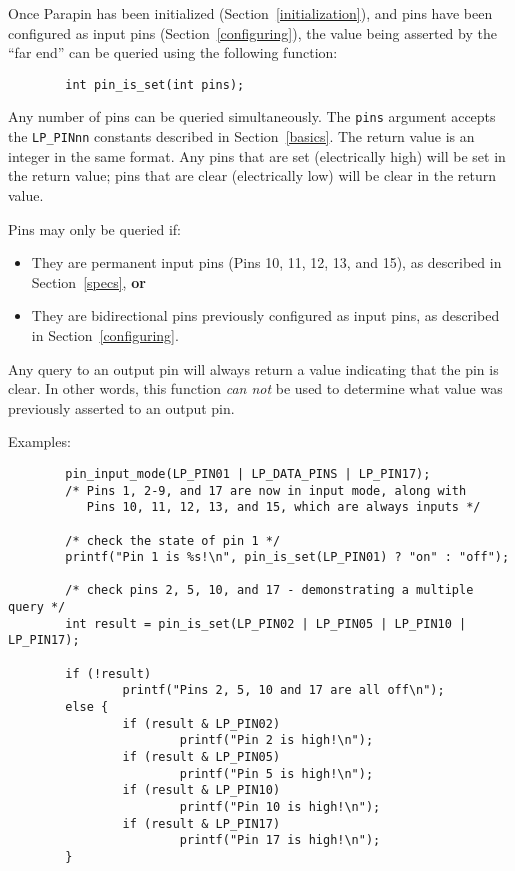 \documentclass{article}
\begin{document}
Once Parapin has been initialized (Section~\ref{initialization}), and
pins have been configured as input pins (Section~\ref{configuring}),
the value being asserted by the ``far end'' can be queried using the
following function:
\begin{verbatim}
        int pin_is_set(int pins);
\end{verbatim}

Any number of pins can be queried simultaneously.  The {\tt pins}
argument accepts the {\tt LP\_PINnn} constants described in
Section~\ref{basics}.  The return value is an integer in the same
format.  Any pins that are set (electrically high) will be set in the
return value; pins that are clear (electrically low) will be clear in
the return value.

Pins may only be queried if:
\begin{itemize}
\item They are permanent input pins (Pins 10, 11, 12, 13, and 15), as
described in Section~\ref{specs}, {\bf or}
\item They are bidirectional pins previously configured as input pins,
as described in Section~\ref{configuring}.
\end{itemize}

Any query to an output pin will always return a value indicating that
the pin is clear.  In other words, this function {\em can not} be used
to determine what value was previously asserted to an output pin.

Examples:
\begin{verbatim}
        pin_input_mode(LP_PIN01 | LP_DATA_PINS | LP_PIN17);
        /* Pins 1, 2-9, and 17 are now in input mode, along with
           Pins 10, 11, 12, 13, and 15, which are always inputs */

        /* check the state of pin 1 */
        printf("Pin 1 is %s!\n", pin_is_set(LP_PIN01) ? "on" : "off");

        /* check pins 2, 5, 10, and 17 - demonstrating a multiple query */
        int result = pin_is_set(LP_PIN02 | LP_PIN05 | LP_PIN10 | LP_PIN17);

        if (!result)
                printf("Pins 2, 5, 10 and 17 are all off\n");
        else {
                if (result & LP_PIN02)
                        printf("Pin 2 is high!\n");
                if (result & LP_PIN05)
                        printf("Pin 5 is high!\n");
                if (result & LP_PIN10)
                        printf("Pin 10 is high!\n");
                if (result & LP_PIN17)
                        printf("Pin 17 is high!\n");
        }
\end{verbatim}
\end{document}
